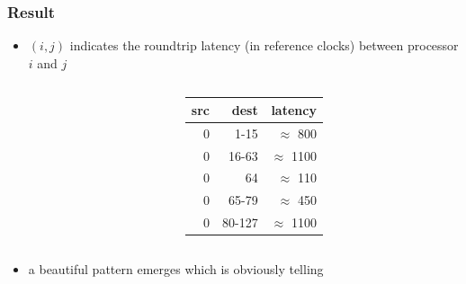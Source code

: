 \documentclass[12pt,dvipdfmx]{beamer}
\begin{document}
\begin{frame}
\frametitle{Result}
\begin{itemize}
\item $(i,j)$ indicates the roundtrip latency (in reference clocks)
  between processor $i$ and $j$ 

  \begin{columns}
    \begin{column}{0.6\textwidth}
    \end{column}
    \begin{column}{0.4\textwidth}
{\footnotesize
\begin{tabular}{|r|r|r|}\hline
src & dest & latency \\\hline
0 & 1-15   & $\approx$ 800 \\
0 & 16-63  & $\approx$ 1100 \\
0 & 64     & $\approx$ 110 \\
0 & 65-79  & $\approx$ 450 \\
0 & 80-127  & $\approx$ 1100 \\\hline
\end{tabular}}
    \end{column}
  \end{columns}

\item a beautiful pattern emerges which is obviously telling

\end{itemize}
\end{frame}
\end{document}
